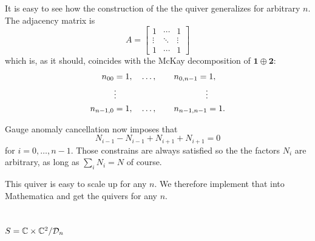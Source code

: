         It is easy to see how the construction of the the quiver generalizes for arbitrary $n$. The adjacency matrix is
        \begin{equation}
            A=
            \begin{bmatrix}
                1 & \cdots & 1 \\
                \vdots & \ddots & \vdots \\
                1 & \cdots & 1
            \end{bmatrix}
        \end{equation}
        which is, as it should, coincides with the McKay decomposition of $\boldsymbol{1}\oplus\boldsymbol{2}$:
        \begin{align}
            \begin{split}
                n_{00} &= 1,\quad\dots,\qquad n_{0,n-1}=1,\\
                &\vdots\hspace{3.7cm}\vdots\\
                n_{n-1,0} &= 1,\quad\dots,\qquad n_{n-1,n-1}=1.
            \end{split}
        \end{align}
        
        Gauge anomaly cancellation now imposes that
        \begin{equation}
            N_{i-1}-N_{i-1}+N_{i+1}+N_{i+1}=0
        \end{equation}
        for $i=0,\dots,n-1$. Those constrains are always satisfied so the the factors $N_i$ are arbitrary, as long as $\sum_iN_i=N$ of course.

        This quiver is easy to scale up for any $n$. We therefore implement that into Mathematica and get the quivers for any $n$.

    \subsection{$S=\mathbb{C}\times\mathbb{C}^2/\mathcal{D}_n$}


